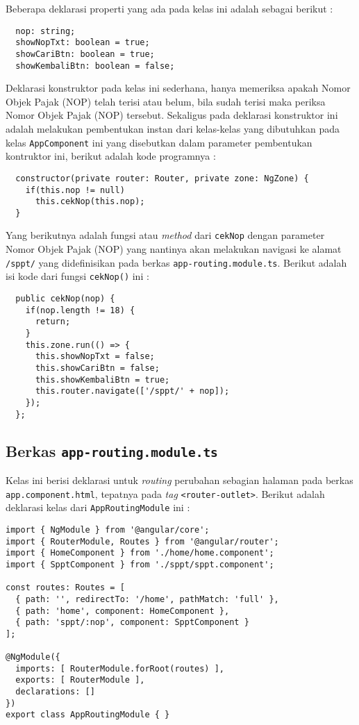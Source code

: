 \documentclass[pdftex,12pt, oneside]{article}
\begin{document}
Beberapa deklarasi properti yang ada pada kelas ini adalah sebagai berikut :

\begin{lstlisting}
  nop: string;
  showNopTxt: boolean = true;
  showCariBtn: boolean = true;
  showKembaliBtn: boolean = false;
\end{lstlisting}

Deklarasi konstruktor pada kelas ini sederhana, hanya memeriksa apakah Nomor Objek Pajak (NOP) telah terisi atau belum, bila sudah terisi maka periksa Nomor Objek Pajak (NOP) tersebut. Sekaligus pada deklarasi konstruktor ini adalah melakukan pembentukan instan dari kelas-kelas yang dibutuhkan pada kelas \texttt{AppComponent} ini yang disebutkan dalam parameter pembentukan kontruktor ini, berikut adalah kode programnya :

\begin{lstlisting}
  constructor(private router: Router, private zone: NgZone) {
    if(this.nop != null) 
      this.cekNop(this.nop);
  }
\end{lstlisting}

Yang berikutnya adalah fungsi atau \textit{method} dari \texttt{cekNop} dengan parameter Nomor Objek Pajak (NOP) yang nantinya akan melakukan navigasi ke alamat \texttt{/sppt/} yang didefinisikan pada berkas \texttt{app-routing.module.ts}. Berikut adalah isi kode dari fungsi \texttt{cekNop()} ini :

\begin{lstlisting}
  public cekNop(nop) {
    if(nop.length != 18) {
      return;
    }
    this.zone.run(() => {
      this.showNopTxt = false;
      this.showCariBtn = false;
      this.showKembaliBtn = true;
      this.router.navigate(['/sppt/' + nop]);
    });
  };
\end{lstlisting}

\subsection{Berkas \texttt{app-routing.module.ts}}

Kelas ini berisi deklarasi untuk \textit{routing} perubahan sebagian halaman pada berkas \texttt{app.component.html}, tepatnya pada \textit{tag} \texttt{<router-outlet>}. Berikut adalah deklarasi kelas dari \texttt{AppRoutingModule} ini :

\begin{lstlisting}
import { NgModule } from '@angular/core';
import { RouterModule, Routes } from '@angular/router';
import { HomeComponent } from './home/home.component';
import { SpptComponent } from './sppt/sppt.component';

const routes: Routes = [
  { path: '', redirectTo: '/home', pathMatch: 'full' },
  { path: 'home', component: HomeComponent },
  { path: 'sppt/:nop', component: SpptComponent }
];

@NgModule({
  imports: [ RouterModule.forRoot(routes) ],
  exports: [ RouterModule ],
  declarations: []
})
export class AppRoutingModule { }
\end{lstlisting}
\end{document}
